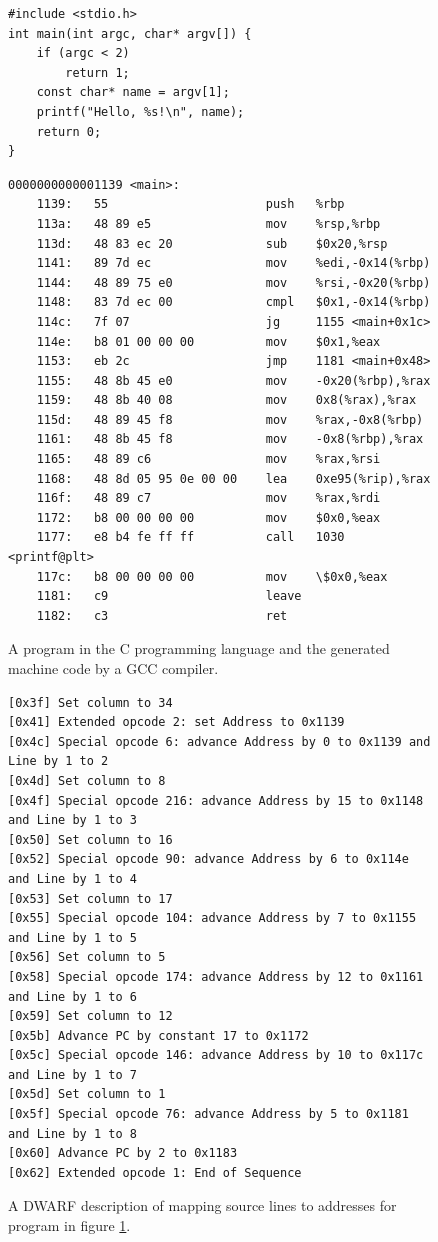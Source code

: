 \begin{figure}
    \begin{verbatim}
#include <stdio.h>
int main(int argc, char* argv[]) {
    if (argc < 2)
        return 1;
    const char* name = argv[1];
    printf("Hello, %s!\n", name);
    return 0;
}
    \end{verbatim}
    \begin{lstlisting}
0000000000001139 <main>:
    1139:	55                   	push   %rbp
    113a:	48 89 e5             	mov    %rsp,%rbp
    113d:	48 83 ec 20          	sub    $0x20,%rsp
    1141:	89 7d ec             	mov    %edi,-0x14(%rbp)
    1144:	48 89 75 e0          	mov    %rsi,-0x20(%rbp)
    1148:	83 7d ec 00          	cmpl   $0x1,-0x14(%rbp)
    114c:	7f 07                	jg     1155 <main+0x1c>
    114e:	b8 01 00 00 00       	mov    $0x1,%eax
    1153:	eb 2c                	jmp    1181 <main+0x48>
    1155:	48 8b 45 e0          	mov    -0x20(%rbp),%rax
    1159:	48 8b 40 08          	mov    0x8(%rax),%rax
    115d:	48 89 45 f8          	mov    %rax,-0x8(%rbp)
    1161:	48 8b 45 f8          	mov    -0x8(%rbp),%rax
    1165:	48 89 c6             	mov    %rax,%rsi
    1168:	48 8d 05 95 0e 00 00 	lea    0xe95(%rip),%rax
    116f:	48 89 c7             	mov    %rax,%rdi
    1172:	b8 00 00 00 00       	mov    $0x0,%eax
    1177:	e8 b4 fe ff ff       	call   1030 <printf@plt>
    117c:	b8 00 00 00 00       	mov    \$0x0,%eax
    1181:	c9                   	leave
    1182:	c3                   	ret
    \end{lstlisting}
    \caption{A program in the C programming language and the generated machine code by a GCC compiler.}
    \label{fig:c-program-and-its-assembly}
\end{figure}

\begin{figure}
    \begin{lstlisting}
[0x3f] Set column to 34
[0x41] Extended opcode 2: set Address to 0x1139
[0x4c] Special opcode 6: advance Address by 0 to 0x1139 and Line by 1 to 2
[0x4d] Set column to 8
[0x4f] Special opcode 216: advance Address by 15 to 0x1148 and Line by 1 to 3
[0x50] Set column to 16
[0x52] Special opcode 90: advance Address by 6 to 0x114e and Line by 1 to 4
[0x53] Set column to 17
[0x55] Special opcode 104: advance Address by 7 to 0x1155 and Line by 1 to 5
[0x56] Set column to 5
[0x58] Special opcode 174: advance Address by 12 to 0x1161 and Line by 1 to 6
[0x59] Set column to 12
[0x5b] Advance PC by constant 17 to 0x1172
[0x5c] Special opcode 146: advance Address by 10 to 0x117c and Line by 1 to 7
[0x5d] Set column to 1
[0x5f] Special opcode 76: advance Address by 5 to 0x1181 and Line by 1 to 8
[0x60] Advance PC by 2 to 0x1183
[0x62] Extended opcode 1: End of Sequence
    \end{lstlisting}
    \caption{A DWARF description of mapping source lines to addresses for
    program in figure \ref{fig:c-program-and-its-assembly}.}
    \label{fig:dwarf-locations}
\end{figure}

